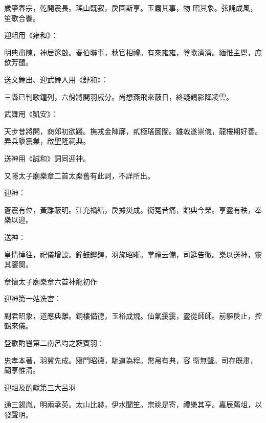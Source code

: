 \begin{pinyinscope}
 歲肇春宗，乾開震長。瑤山既寂，戾園斯享。玉肅其事，物
 昭其象。弦誦成風，笙歌合響。



 迎俎用《雍和》：



 明典肅陳，神居邃啟。春伯聯事，秋官相禮。有來雍雍，登歌濟濟。緬惟主鬯，庶歆芳醴。



 送文舞出、迎武舞入用《舒和》：



 三縣已判歌鐘列，六佾將開羽戚分。尚想燕飛來蔽日，終疑鶴影降凌雲。



 武舞用《凱安》：



 天步昔將開，商郊初欲踐。撫戎金陣廓，貳極瑤圖闡。雞戟遂崇儀，龍樓期好善。弄兵隳震業，啟聖隆祠典。



 送神用《誠和》詞同迎神。



 又隱太子廟樂章二首太樂舊有此詞，不詳所出。



 迎神：



 蒼震有位，黃離蔽明。江充禍結，戾據災成。銜冤昔痛，贈典今榮。享靈有秩，奉樂以迎。



 送神：



 皇情悼往，祀儀增設。鐘鼓鏗鍠，羽旄昭晣。掌禮云備，司筵告徹。樂以送神，靈其鑒闋。



 章懷太子廟樂章六首神龍初作



 迎神第一姑洗宮：



 副君昭象，道應典離。銅樓備德，玉裕成規。仙氣靄靄，靈從師師。前驅戾止，控鶴來儀。



 登歌酌鬯第二南呂均之蕤賓羽：



 忠孝本著，羽翼先成。寢門昭德，馳道為程。幣帛有典，容
 衛無聲。司存既肅，廟享惟清。



 迎俎及酌獻第三大呂羽



 通三錫胤，明兩承英。太山比赫，伊水聞笙。宗祧是寄，禮樂其亨。嘉辰薦俎，以發聲明。




\end{pinyinscope}

